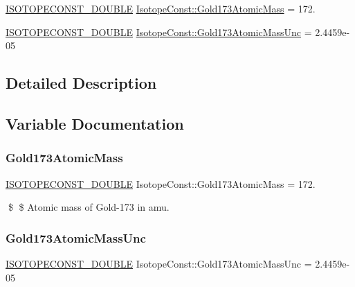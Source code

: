 \begin{DoxyCompactItemize}
\item 
\mbox{\hyperlink{group___isotope_const-_macros_ga8f45a7272ce02c0b4c65c44636ed719a}{I\+S\+O\+T\+O\+P\+E\+C\+O\+N\+S\+T\+\_\+\+D\+O\+U\+B\+LE}} \mbox{\hyperlink{group___isotope_const-_gold-_au173_gae0f2ec51083cc5c3572f9b61aaf3507f}{Isotope\+Const\+::\+Gold173\+Atomic\+Mass}} = 172.
\item 
\mbox{\hyperlink{group___isotope_const-_macros_ga8f45a7272ce02c0b4c65c44636ed719a}{I\+S\+O\+T\+O\+P\+E\+C\+O\+N\+S\+T\+\_\+\+D\+O\+U\+B\+LE}} \mbox{\hyperlink{group___isotope_const-_gold-_au173_ga7ce877b8caf18163255f2f71d2574a05}{Isotope\+Const\+::\+Gold173\+Atomic\+Mass\+Unc}} = 2.\+4459e-\/05
\end{DoxyCompactItemize}


\subsection{Detailed Description}


\subsection{Variable Documentation}
\mbox{\label{group___isotope_const-_gold-_au173_gae0f2ec51083cc5c3572f9b61aaf3507f}} 
\subsubsection{\texorpdfstring{Gold173\+Atomic\+Mass}{Gold173AtomicMass}}
{\footnotesize\ttfamily \mbox{\hyperlink{group___isotope_const-_macros_ga8f45a7272ce02c0b4c65c44636ed719a}{I\+S\+O\+T\+O\+P\+E\+C\+O\+N\+S\+T\+\_\+\+D\+O\+U\+B\+LE}} Isotope\+Const\+::\+Gold173\+Atomic\+Mass = 172.}

\$ \$ Atomic mass of Gold-\/173 in amu. \mbox{\label{group___isotope_const-_gold-_au173_ga7ce877b8caf18163255f2f71d2574a05}} 
\subsubsection{\texorpdfstring{Gold173\+Atomic\+Mass\+Unc}{Gold173AtomicMassUnc}}
{\footnotesize\ttfamily \mbox{\hyperlink{group___isotope_const-_macros_ga8f45a7272ce02c0b4c65c44636ed719a}{I\+S\+O\+T\+O\+P\+E\+C\+O\+N\+S\+T\+\_\+\+D\+O\+U\+B\+LE}} Isotope\+Const\+::\+Gold173\+Atomic\+Mass\+Unc = 2.\+4459e-\/05}

